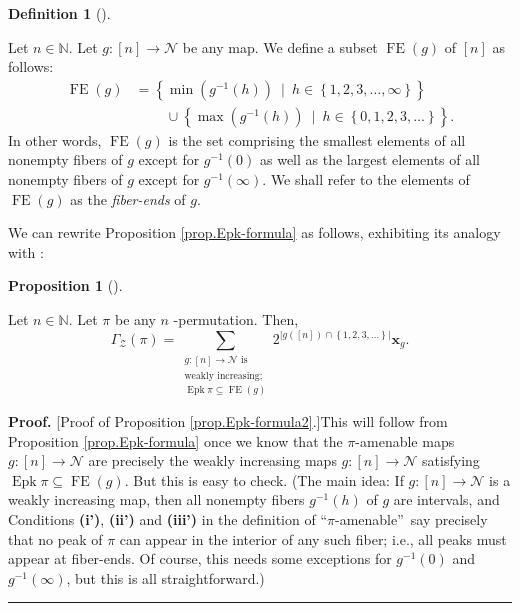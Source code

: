 \documentclass[numbers=enddot,12pt,final,onecolumn,notitlepage]{scrartcl}%
\theoremstyle{definition}
\newtheorem{prop}[theo]{Proposition}
\newenvironment{proposition}[1][]
{\begin{prop}[#1]\begin{leftbar}}
{\end{leftbar}\end{prop}}
\newtheorem{defi}[theo]{Definition}
\newenvironment{definition}[1][]
{\begin{defi}[#1]\begin{leftbar}}
{\end{leftbar}\end{defi}}
\newenvironment{proof}[1][Proof]{\noindent\textbf{#1.} }{\ \rule{0.5em}{0.5em}}
\let\sumnonlimits\sum
\renewcommand{\sum}{\sumnonlimits\limits}
\begin{document}
\begin{definition}
\label{def.fiberends}Let $n\in\mathbb{N}$. Let $g:\left[  n\right]
\rightarrow\mathcal{N}$ be any map. We define a subset $\operatorname*{FE}%
\left(  g\right)  $ of $\left[  n\right]  $ as follows:%
\begin{align*}
\operatorname*{FE}\left(  g\right)   &  =\left\{  \min\left(  g^{-1}\left(
h\right)  \right)  \ \mid\ h\in\left\{  1,2,3,\ldots,\infty\right\}  \right\}
\\
&  \ \ \ \ \ \ \ \ \ \ \cup\left\{  \max\left(  g^{-1}\left(  h\right)
\right)  \ \mid\ h\in\left\{  0,1,2,3,\ldots\right\}  \right\}  .
\end{align*}
In other words, $\operatorname*{FE}\left(  g\right)  $ is the set comprising
the smallest elements of all nonempty fibers of $g$ except for $g^{-1}\left(
0\right)  $ as well as the largest elements of all nonempty fibers of $g$
except for $g^{-1}\left(  \infty\right)  $. We shall refer to the elements of
$\operatorname*{FE}\left(  g\right)  $ as the \textit{fiber-ends} of $g$.
\end{definition}

We can rewrite Proposition \ref{prop.Epk-formula} as follows, exhibiting its
analogy with \cite[Proposition 2.2]{Stembr97}:

\begin{proposition}
\label{prop.Epk-formula2}Let $n\in\mathbb{N}$. Let $\pi$ be any $n$%
-permutation. Then,%
\[
\Gamma_{\mathcal{Z}}\left(  \pi\right)  =\sum_{\substack{g:\left[  n\right]
\rightarrow\mathcal{N}\text{ is}\\\text{weakly increasing;}%
\\\operatorname*{Epk}\pi\subseteq\operatorname*{FE}\left(  g\right)
}}2^{\left\vert g\left(  \left[  n\right]  \right)  \cap\left\{
1,2,3,\ldots\right\}  \right\vert }\mathbf{x}_{g}.
\]

\end{proposition}

\begin{proof}
[Proof of Proposition \ref{prop.Epk-formula2}.]This will follow from
Proposition \ref{prop.Epk-formula} once we know that the $\pi$-amenable maps
$g:\left[  n\right]  \rightarrow\mathcal{N}$ are precisely the weakly
increasing maps $g:\left[  n\right]  \rightarrow\mathcal{N}$ satisfying
$\operatorname*{Epk}\pi\subseteq\operatorname*{FE}\left(  g\right)  $. But
this is easy to check. (The main idea: If $g:\left[  n\right]  \rightarrow
\mathcal{N}$ is a weakly increasing map, then all nonempty fibers
$g^{-1}\left(  h\right)  $ of $g$ are intervals, and Conditions \textbf{(i')},
\textbf{(ii')} and \textbf{(iii')} in the definition of \textquotedblleft$\pi
$-amenable\textquotedblright\ say precisely that no peak of $\pi$ can appear
in the interior of any such fiber; i.e., all peaks must appear at fiber-ends.
Of course, this needs some exceptions for $g^{-1}\left(  0\right)  $ and
$g^{-1}\left(  \infty\right)  $, but this is all straightforward.)
\end{proof}
\end{document}
